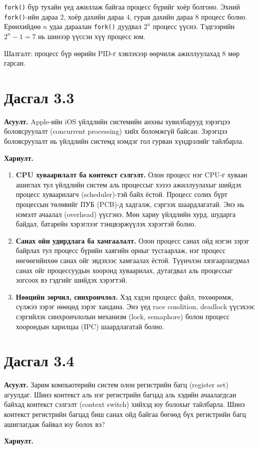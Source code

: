 \documentclass[12pt,a4paper]{article}
\newcommand{\question}[2]{\section{Дасгал #1}\textbf{Асуулт.} #2\par\medskip\textbf{Хариулт.}\par}
\begin{document}
\texttt{fork()} бүр тухайн үед ажиллаж байгаа процесс бүрийг хоёр болгоно. Эхний \texttt{fork()}-ийн дараа 2, хоёр дахийн дараа 4, гурав дахийн дараа 8 процесс болно. Ерөнхийдөө $n$ удаа дараалан \texttt{fork()} дуудвал $2^n$ процесс үүснэ. Тэдгээрийн $2^n-1 = 7$ нь шинээр үүссэн хүү процесс юм.

Шалгалт: процесс бүр өөрийн PID-г хэвлэхээр өөрчилж ажиллуулахад 8 мөр гарсан.

\question{3.3}{Apple-ийн iOS үйлдлийн системийн анхны хувилбарууд зэрэгцээ боловсруулалт (concurrent processing) хийх боломжгүй байсан. Зэрэгцээ боловсруулалт нь үйлдлийн системд нэмдэг гол гурван хүндрэлийг тайлбарла.}

\begin{enumerate}[leftmargin=1.5em]
  \item \textbf{CPU хуваарилалт ба контекст сэлгэлт.} Олон процесс нэг CPU-г хуваан ашиглах тул үйлдлийн систем аль процессыг хэзээ ажиллуулахыг шийдэх процесс хуваарилагч (scheduler)-тэй байх ёстой. Процесс солих бүрт процессын төлөвийг ПУБ (PCB)-д хадгалж, сэргээх шаардлагатай. Энэ нь нэмэлт ачаалал (overhead) үүсгэнэ. Мөн хариу үйлдлийн хурд, шударга байдал, батарейн хэрэглээг тэнцвэржүүлэх хэрэгтэй болно.
  \item \textbf{Санах ойн удирдлага ба хамгаалалт.} Олон процесс санах ойд нэгэн зэрэг байрлах тул процесс бүрийн хаягийн орныг тусгаарлаж, нэг процесс нөгөөгийнхөө санах ойг эвдэхээс хамгаалах ёстой. Түүнчлэн хязгаарлагдмал санах ойг процессуудын хооронд хуваарилах, дутагдвал аль процессыг зогсоох вэ гэдгийг шийдэх хэрэгтэй.
  \item \textbf{Нөөцийн зөрчил, синхрончлол.} Хэд хэдэн процесс файл, төхөөрөмж, сүлжээ зэрэг нөөцөд зэрэг хандана. Энэ үед race condition, deadlock үүсэхээс сэргийлэх синхрончлолын механизм (lock, semaphore) болон процесс хоорондын харилцаа (IPC) шаардлагатай болно.
\end{enumerate}

\question{3.4}{Зарим компьютерийн систем олон регистрийн багц (register set) агуулдаг. Шинэ контекст аль нэг регистрийн багцад аль хэдийн ачаалагдсан байхад контекст сэлгэлт (context switch) хийхэд юу болохыг тайлбарла. Шинэ контекст регистрийн багцад биш санах ойд байгаа бөгөөд бүх регистрийн багц ашиглагдаж байвал юу болох вэ?}
\end{document}
